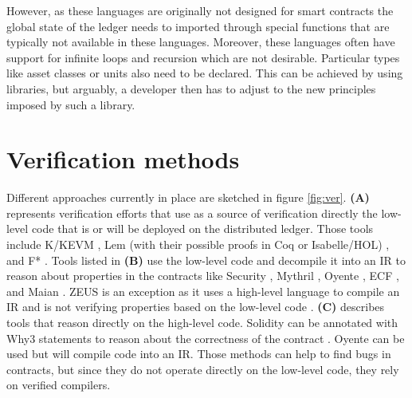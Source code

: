 \documentclass{llncs}
\begin{document}
However, as these languages are originally not designed for smart contracts the global state of the ledger needs to imported through special functions that are typically not available in these languages.
Moreover, these languages often have support for infinite loops and recursion which are not desirable.
Particular types like asset classes or units also need to be declared. 
This can be achieved by using libraries, but arguably, a developer then has to adjust to the new principles imposed by such a library.


\section{Verification methods}
\label{verification}

Different approaches currently in place are sketched in figure \ref{fig:ver}. 
\textbf{(A)} represents verification efforts that use as a source of verification directly the low-level code that is or will be deployed on the distributed ledger. Those tools include K/KEVM \cite{Hildenbrandt2017}, Lem (with their possible proofs in Coq or Isabelle/HOL) \cite{Hirai2017}, and F* \cite{Bhargavan2016,Grishchenko2018}.
Tools listed in \textbf{(B)} use the low-level code and decompile it into an IR to reason about properties in the contracts like Security \cite{Tsankov2017}, Mythril \cite{Mueller2018}, Oyente \cite{Luu2016,Albert2018}, ECF \cite{Grossman2017}, and Maian \cite{Nikolic2018}. ZEUS is an exception as it uses a high-level language to compile an IR and is not verifying properties based on the low-level code \cite{Kalra2018}.
\textbf{(C)} describes tools that reason directly on the high-level code. Solidity can be annotated with Why3 statements to reason about the correctness of the contract \cite{Reitwiessner2015Why3}. Oyente can be used but will compile code into an IR. Those methods can help to find bugs in contracts, but since they do not operate directly on the low-level code, they rely on verified compilers.
\end{document}
